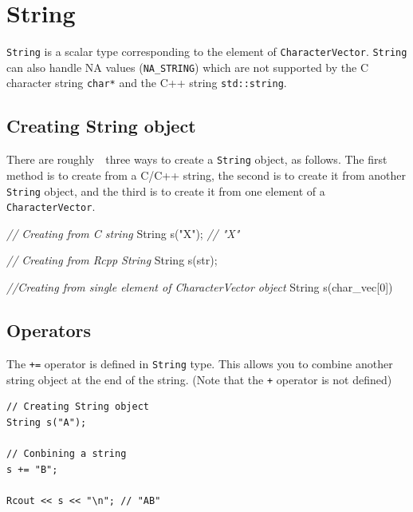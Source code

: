\documentclass[]{book}
\newenvironment{Shaded}{\begin{snugshade}}{\end{snugshade}}
\newcommand{\CommentTok}[1]{\textcolor[rgb]{0.56,0.35,0.01}{\textit{#1}}}
\newcommand{\DecValTok}[1]{\textcolor[rgb]{0.00,0.00,0.81}{#1}}
\newcommand{\NormalTok}[1]{#1}
\newcommand{\StringTok}[1]{\textcolor[rgb]{0.31,0.60,0.02}{#1}}
\begin{document}
\hypertarget{string}{%
\chapter{String}\label{string}}

\texttt{String} is a scalar type corresponding to the element of \texttt{CharacterVector}. \texttt{String} can also handle NA values (\texttt{NA\_STRING}) which are not supported by the C character string \texttt{char*} and the C++ string \texttt{std::string}.

\hypertarget{creating-string-object}{%
\section{Creating String object}\label{creating-string-object}}

There are roughly　three ways to create a \texttt{String} object, as follows. The first method is to create from a C/C++ string, the second is to create it from another \texttt{String} object, and the third is to create it from one element of a \texttt{CharacterVector}.

\begin{Shaded}
\begin{Highlighting}[]
\CommentTok{// Creating from C string}
\NormalTok{String s(}\StringTok{"X"}\NormalTok{); }\CommentTok{// "X"}

\CommentTok{// Creating from Rcpp String}
\NormalTok{String s(str);}

\CommentTok{//Creating from single element of CharacterVector object}
\NormalTok{String s(char_vec[}\DecValTok{0}\NormalTok{])}
\end{Highlighting}
\end{Shaded}

\hypertarget{operators}{%
\section{Operators}\label{operators}}

The \texttt{+=} operator is defined in \texttt{String} type. This allows you to combine another string object at the end of the string. (Note that the \texttt{+} operator is not defined)

\begin{verbatim}
// Creating String object
String s("A");

// Conbining a string
s += "B";

Rcout << s << "\n"; // "AB"
\end{verbatim}
\end{document}

